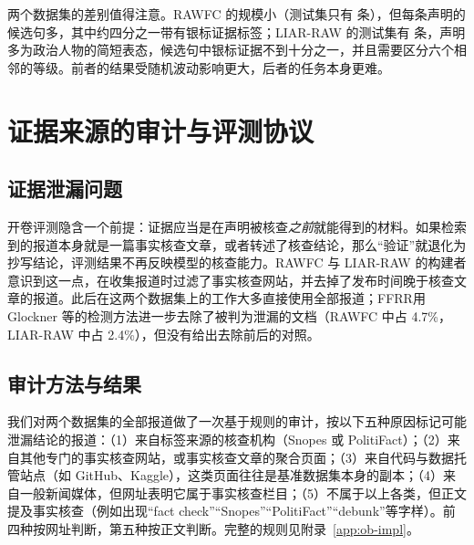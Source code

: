 \begin{table}[htbp]
\centering\small
\caption{RAWFC 与 LIAR-RAW 的统计信息}\label{tab:ob-data}
\end{table}

两个数据集的差别值得注意。RAWFC 的规模小（测试集只有  条），但每条声明的候选句多，其中约四分之一带有银标证据标签；LIAR-RAW 的测试集有  条，声明多为政治人物的简短表态，候选句中银标证据不到十分之一，并且需要区分六个相邻的等级。前者的结果受随机波动影响更大，后者的任务本身更难。

\section{证据来源的审计与评测协议}\label{sec:ob-audit}

\subsection{证据泄漏问题}

开卷评测隐含一个前提：证据应当是在声明被核查\emph{之前}就能得到的材料。如果检索到的报道本身就是一篇事实核查文章，或者转述了核查结论，那么“验证”就退化为抄写结论，评测结果不再反映模型的核查能力\citep{glockner2022missing}。RAWFC 与 LIAR-RAW 的构建者意识到这一点，在收集报道时过滤了事实核查网站，并去掉了发布时间晚于核查文章的报道\citep{yang2022cofced}。此后在这两个数据集上的工作大多直接使用全部报道；FFRR\citep{zhang2024ffrr}用 Glockner 等\citep{glockner2022missing}的检测方法进一步去除了被判为泄漏的文档（RAWFC 中占 4.7\%，LIAR-RAW 中占 2.4\%），但没有给出去除前后的对照。

\subsection{审计方法与结果}

我们对两个数据集的全部报道做了一次基于规则的审计，按以下五种原因标记可能泄漏结论的报道：（1）来自标签来源的核查机构（Snopes 或 PolitiFact）；（2）来自其他专门的事实核查网站，或事实核查文章的聚合页面；（3）来自代码与数据托管站点（如 GitHub、Kaggle），这类页面往往是基准数据集本身的副本；（4）来自一般新闻媒体，但网址表明它属于事实核查栏目；（5）不属于以上各类，但正文提及事实核查（例如出现“fact check”“Snopes”“PolitiFact”“debunk”等字样）。前四种按网址判断，第五种按正文判断。完整的规则见附录~\ref{app:ob-impl}。

